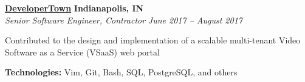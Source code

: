 %
    \headerrow
        {\textbf{\href{https://www.developertown.com/}{DeveloperTown}}}
        {\textbf{Indianapolis, IN}}
    \\
    \headerrow
        {\emph{Senior Software Engineer, Contractor}}
        {\emph{June 2017 -- August 2017}}
    \begin{itemize*}
        \item Contributed to the design and implementation of a scalable multi-tenant Video Software as a Service (VSaaS) web portal
    \end{itemize*}

    \hspace{1.0em}
        {\textbf{Technologies:} Vim, Git, Bash, SQL, PostgreSQL, and others}
